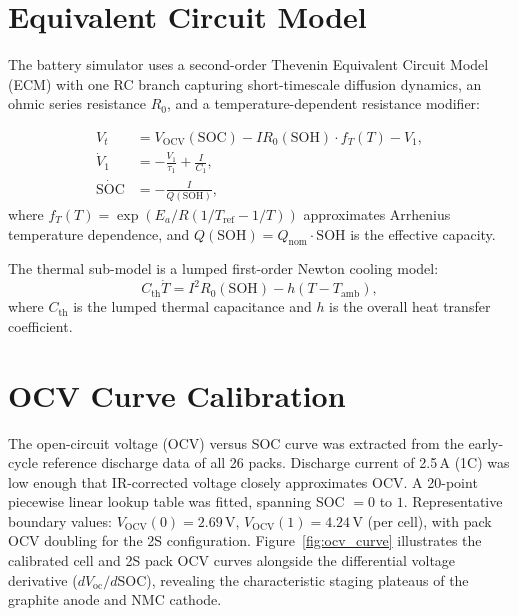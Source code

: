 \label{chap.4}

\section{Equivalent Circuit Model}

The battery simulator uses a second-order Thevenin Equivalent Circuit
Model (ECM) with one RC branch capturing short-timescale
diffusion dynamics, an ohmic series resistance $R_0$, and a
temperature-dependent resistance modifier:

\begin{align}
  V_t &= V_{\mathrm{OCV}}(\mathrm{SOC}) - I R_0(\mathrm{SOH})
         \cdot f_T(T) - V_1, \label{eq:terminal_voltage} \\
  \dot{V}_1 &= -\frac{V_1}{\tau_1} + \frac{I}{C_1},
  \label{eq:rc_dynamics} \\
  \dot{\mathrm{SOC}} &= -\frac{I}{Q(\mathrm{SOH})},
  \label{eq:soc_dynamics}
\end{align}
where $f_T(T) = \exp(E_a/R (1/T_{\mathrm{ref}} - 1/T))$
approximates Arrhenius temperature dependence, and
$Q(\mathrm{SOH}) = Q_{\mathrm{nom}} \cdot \mathrm{SOH}$ is the
effective capacity.

The thermal sub-model is a lumped first-order Newton cooling model:
\begin{equation}
  C_{\mathrm{th}} \dot{T} = I^2 R_0(\mathrm{SOH}) - h(T - T_{\mathrm{amb}}),
  \label{eq:thermal_model}
\end{equation}
where $C_{\mathrm{th}}$ is the lumped thermal capacitance and $h$ is
the overall heat transfer coefficient.

\section{OCV Curve Calibration}

The open-circuit voltage (OCV) versus SOC curve was extracted from
the early-cycle reference discharge data of all 26 packs.
Discharge current of 2.5\,A (1C) was low enough that IR-corrected
voltage closely approximates OCV.  A 20-point piecewise linear lookup
table was fitted, spanning SOC $= 0$ to $1$.  Representative
boundary values: $V_{\mathrm{OCV}}(0) = 2.69\,\mathrm{V}$,
$V_{\mathrm{OCV}}(1) = 4.24\,\mathrm{V}$ (per cell), with pack OCV
doubling for the 2S configuration.  Figure~\ref{fig:ocv_curve}
illustrates the calibrated cell and 2S pack OCV curves alongside the
differential voltage derivative ($dV_{\mathrm{oc}}/d\mathrm{SOC}$),
revealing the characteristic staging plateaus of the graphite anode and
NMC cathode.

